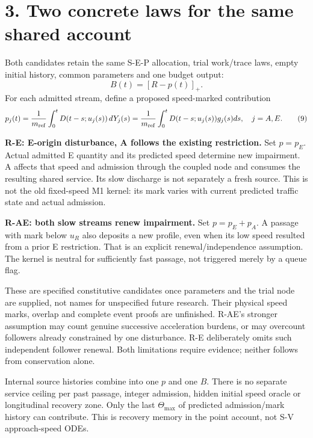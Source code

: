 \documentclass[11pt,a4paper]{article}
\newcommand{\pos}[1]{[#1]_+}
\begin{document}
\newpage
\section*{3. Two concrete laws for the same shared account}

Both candidates retain the same S-E-P allocation, trial work/trace laws,
empty initial history, common parameters and one budget output:
\begin{equation}
 B(t)=\pos{R-p(t)}. \tag{8}
\end{equation}
For each admitted stream, define a proposed speed-marked contribution
\begin{equation}
 p_j(t)=\frac1{m_{\rm ref}}\int_0^tD(t-s;u_j(s))\,dY_j(s)
       =\frac1{m_{\rm ref}}\int_0^t
           D(t-s;u_j(s))g_j(s)ds,\quad j=A,E. \tag{9}
\end{equation}

\textbf{R-E: E-origin disturbance, A follows the existing restriction.}
Set $p=p_E$. Actual admitted E quantity and its predicted speed determine
new impairment. A affects that speed and admission through the coupled
node and consumes the resulting shared service. Its slow discharge is
not separately a fresh source. This is not the old fixed-speed M1 kernel:
its mark varies with current predicted traffic state and actual admission.

\textbf{R-AE: both slow streams renew impairment.}
Set $p=p_E+p_A$. A passage with mark below $u_R$ also deposits a new
profile, even when its low speed resulted from a prior E restriction.
That is an explicit renewal/independence assumption. The kernel is neutral
for sufficiently fast passage, not triggered merely by a queue flag.

These are specified constitutive candidates once parameters and the trial
node are supplied, not names for unspecified future research. Their
physical speed marks, overlap and complete event proofs are unfinished.
R-AE's stronger assumption may count genuine successive acceleration
burdens, or may overcount followers already constrained by one disturbance.
R-E deliberately omits such independent follower renewal. Both limitations
require evidence; neither follows from conservation alone.

Internal source histories combine into one $p$ and one $B$. There is no
separate service ceiling per past passage, integer admission, hidden
initial speed oracle or longitudinal recovery zone. Only the last
$\Theta_{\max}$ of predicted admission/mark history can contribute.
This is recovery memory in the point account, not S-V approach-speed ODEs.
\end{document}
